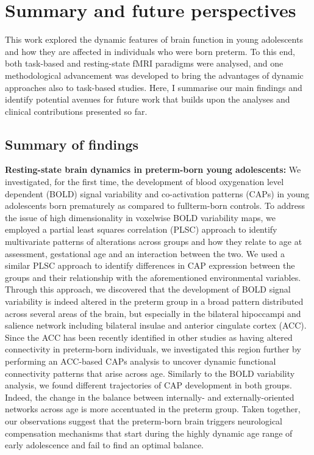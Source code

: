 \chapter{Summary and future perspectives}\label{chapter:ch6}

This work explored the dynamic features of brain function in young adolescents and how they are affected in individuals who were born preterm. To this end, both task-based and resting-state fMRI paradigms were analysed, and one methodological advancement was developed to bring the advantages of dynamic approaches also to task-based studies. Here, I summarise our main findings and identify potential avenues for future work that builds upon the analyses and clinical contributions presented so far. 

\section{Summary of findings}

\textbf{Resting-state brain dynamics in preterm-born young adolescents:} We investigated, for the first time, the development of blood oxygenation level dependent (BOLD) signal variability and co-activation patterns (CAPs) in young adolescents born prematurely as compared to fullterm-born controls. To address the issue of high dimensionality in voxelwise BOLD variability maps, we employed a partial least squares correlation (PLSC) approach to identify multivariate patterns of alterations across groups and how they relate to age at assessment, gestational age and an interaction between the two. We used a similar PLSC approach to identify differences in CAP expression between the groups and their relationship with the aforementioned environmental variables. Through this approach, we discovered that the development of BOLD signal variability is indeed altered in the preterm group in a broad pattern distributed across several areas of the brain, but especially in the bilateral hipoccampi and salience network including bilateral insulae and anterior cingulate cortex (ACC). Since the ACC has been recently identified in other studies as having altered connectivity in preterm-born individuals, we investigated this region further by performing an ACC-based CAPs analysis to uncover dynamic functional connectivity patterns that arise across age. Similarly to the BOLD variability analysis, we found different trajectories of CAP development in both groups.  Indeed, the change in the balance between  internally- and externally-oriented networks across age is more accentuated in the preterm group. Taken together, our observations suggest that the preterm-born brain triggers neurological compensation mechanisms that start during the highly dynamic age range of early adolescence and fail to find an optimal balance.


